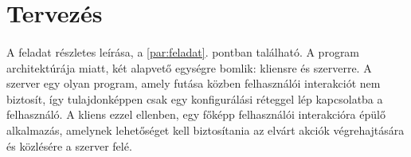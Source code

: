 \documentclass[12pt]{report}
\begin{document}
\section{Tervezés}
\paragraph{}
A  feladat részletes leírása, a \ref{par:feladat}. pontban található. A program architektúrája miatt, két alapvető egységre bomlik: kliensre és szerverre. A szerver egy olyan program, amely futása közben felhasználói interakciót nem biztosít, így tulajdonképpen csak egy konfigurálási réteggel lép kapcsolatba a felhasználó. A kliens ezzel ellenben, egy főképp felhasználói interakcióra épülő alkalmazás, amelynek lehetőséget kell biztosítania az elvárt akciók végrehajtására és közlésére a szerver felé.
\end{document}
